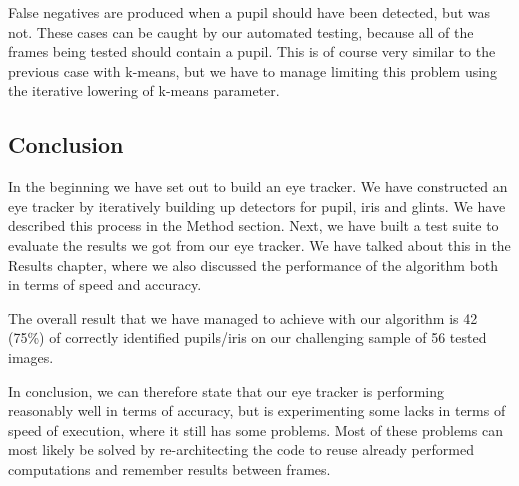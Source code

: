False negatives are produced when a pupil should have been detected, but was not. These cases can be caught by our automated testing, because all of the frames being tested should contain a pupil. This is of course very similar to the previous case with k-means, but we have to manage limiting this problem using the iterative lowering of k-means parameter.


\subsection{Conclusion}
In the beginning we have set out to build an eye tracker. We have constructed an eye tracker by iteratively building up detectors for pupil, iris and glints. We have described this process in the Method section. Next, we have built a test suite to evaluate the results we got from our eye tracker. We have talked about this in the Results chapter, where we also discussed the performance of the algorithm both in terms of speed and accuracy.

The overall result that we have managed to achieve with our algorithm is 42 (75\%) of correctly identified pupils/iris on our challenging sample of 56 tested images.

In conclusion, we can therefore state that our eye tracker is performing reasonably well in terms of accuracy, but is experimenting some lacks in terms of speed of execution, where it still has some problems. Most of these problems can most likely be solved by re-architecting the code to reuse already performed computations and remember results between frames.
